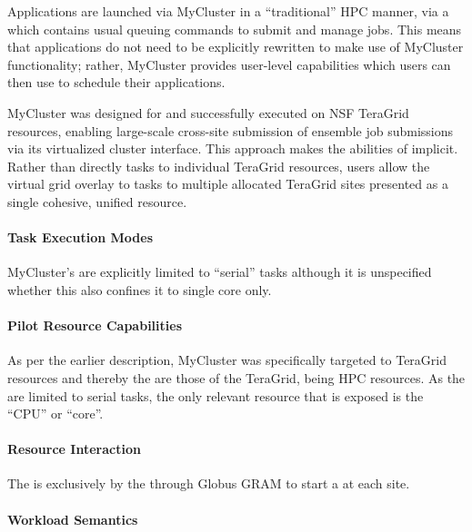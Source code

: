 \documentclass{sig-alternate}
\begin{document}
Applications are launched via MyCluster in a ``traditional'' HPC manner, via a
 which contains usual queuing commands to submit
and manage jobs. This means that applications do not need to be explicitly
rewritten to make use of MyCluster functionality; rather, MyCluster provides
user-level \pilot capabilities which users can then use to schedule their
applications.

MyCluster was designed for and successfully executed on NSF TeraGrid resources,
enabling large-scale cross-site submission of ensemble job submissions via its
virtualized cluster interface. This approach makes the  abilities of \pilot implicit. Rather than directly 
tasks to individual TeraGrid resources, users allow the virtual grid overlay to
 tasks to multiple allocated TeraGrid sites presented as a
single cohesive, unified resource.

\paragraph{Task Execution Modes}

MyCluster's  are explicitly limited to
``serial'' tasks although it is unspecified whether this also confines
it to single core  only.

\paragraph{Pilot Resource Capabilities}

As per the earlier description, MyCluster was specifically targeted to
TeraGrid resources and thereby the  are those
of the TeraGrid, being HPC resources. As the  are
limited to serial tasks, the only relevant resource that is exposed is the
``CPU'' or ``core''.

\paragraph{Resource Interaction}

The  is exclusively by the 
through Globus GRAM to start a  at each site.

\paragraph{Workload Semantics}
\end{document}
